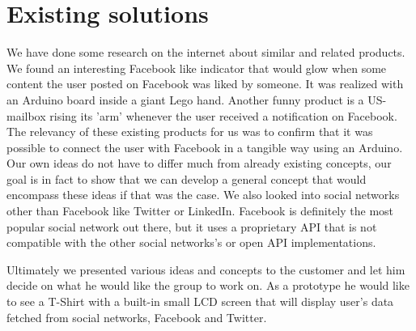 \section{Existing solutions}

We have done some research on the internet about similar and related products. We found an interesting
Facebook like indicator that would glow when some content the user posted on Facebook was liked by someone.
It was realized with an Arduino board inside a giant Lego hand. Another funny product is a US-mailbox rising
its 'arm'  whenever the user received a notification on Facebook. The relevancy of these existing products
for us was to confirm that it was possible to connect the user with Facebook in a tangible way using an Arduino.
Our own ideas do not have to differ much from already existing concepts, our goal is in fact to show that we can
develop a general concept that would encompass these ideas if that was the case. We also looked into social
networks other than Facebook like Twitter or LinkedIn. Facebook is definitely the most popular social network
out there, but it uses a proprietary API that is not compatible with the other social networks's or open
API implementations.

Ultimately we presented various ideas and concepts to the customer and let him decide on what he would
like the group to work on. As a prototype he would like to see a T-Shirt with a built-in small LCD screen
that will display user's data fetched from social networks, Facebook and Twitter.